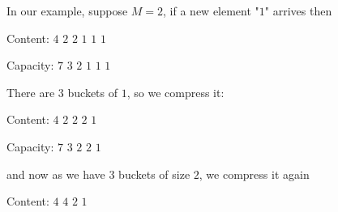 In our example, suppose $M=2$, if a new element "$1$" arrives then

\medskip
\hspace{10pt}       
\smallskip

\nopagebreak
Content: \hspace{.2pt} $4$ \hspace{10pt} $2$ \hspace{10pt} $2$ \hspace{6pt} $1$ \hspace{3pt} $1$ \hspace{3pt} $1$
\smallskip

\nopagebreak
Capacity: $7$ \hspace{10pt} $3$ \hspace{10pt} $2$ \hspace{6pt} $1$  \hspace{3pt} $1$ \hspace{3pt} $1$
\medskip

\noindent
There are $3$ buckets of $1$, so we compress it:

\medskip
\hspace{10pt}       
\smallskip

\nopagebreak
Content: \hspace{.2pt} $4$ \hspace{10pt} $2$ \hspace{12pt} $2$ \hspace{6pt} $2$ \hspace{5pt} $1$
\smallskip

\nopagebreak
Capacity:  $7$ \hspace{10pt} $3$ \hspace{12pt} $2$ \hspace{6pt} $2$  \hspace{5pt} $1$ 
\medskip

\noindent
and now as we have $3$ buckets of size $2$, we compress it again

\medskip
\hspace{10pt}       
\smallskip

\nopagebreak
Content: \hspace{.2pt} $4$ \hspace{14pt} $4$  \hspace{16pt} $2$ \hspace{6pt} $1$
\smallskip

